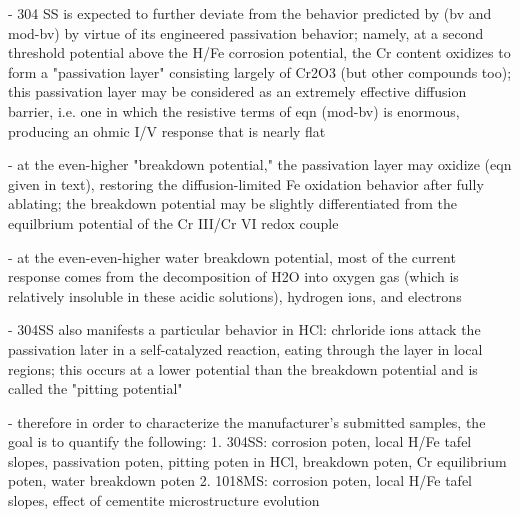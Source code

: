 - 304 SS is expected to further deviate from the behavior predicted by (bv and mod-bv) by virtue of its engineered passivation behavior; namely, at a second threshold potential above the H/Fe corrosion potential, the Cr content oxidizes to form a "passivation layer" consisting largely of Cr2O3 (but other compounds too); this passivation layer may be considered as an extremely effective diffusion barrier, i.e. one in which the resistive terms of eqn (mod-bv) is enormous, producing an ohmic I/V response that is nearly flat

- at the even-higher "breakdown potential," the passivation layer may oxidize (eqn given in text), restoring the diffusion-limited Fe oxidation behavior after fully ablating; the breakdown potential may be slightly differentiated from the equilbrium potential of the Cr III/Cr VI redox couple

- at the even-even-higher water breakdown potential, most of the current response comes from the decomposition of H2O into oxygen gas (which is relatively insoluble in these acidic solutions), hydrogen ions, and electrons

- 304SS also manifests a particular behavior in HCl: chrloride ions attack the passivation later in a self-catalyzed reaction, eating through the layer in local regions; this occurs at a lower potential than the breakdown potential and is called the "pitting potential"

- therefore in order to characterize the manufacturer's submitted samples, the goal is to quantify the following:
	1. 304SS: corrosion poten, local H/Fe tafel slopes, passivation poten, pitting poten in HCl, breakdown poten, Cr equilibrium poten, water breakdown poten
	2. 1018MS: corrosion poten, local H/Fe tafel slopes, effect of cementite microstructure evolution

